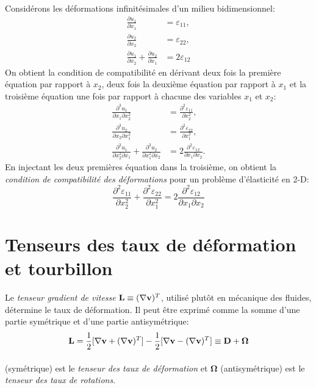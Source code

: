 \paragraph{}
Considérons les déformations infinitésimales d'un milieu bidimensionnel:
$$\begin{aligned}
\frac{\partial u_1}{\partial x_1}&=\varepsilon_{11},\\
\frac{\partial u_2}{\partial x_2}&=\varepsilon_{22},\\
\frac{\partial u_1}{\partial x_2}+\frac{\partial u_2}{\partial x_1}&=2\varepsilon_{12}
\end{aligned}$$
On obtient  la condition de compatibilité en dérivant deux fois la première équation par rapport à $x_2$, deux fois la deuxième équation par rapport à $x_1$ et la troisième équation une fois par rapport à chacune des variables $x_1$ et $x_2$:
$$\begin{aligned}
\frac{\partial^3 u_1}{\partial x_1\partial x_2^2}&=\frac{\partial^2\varepsilon_{11}}{\partial x_2^2},\\
\frac{\partial^3 u_2}{\partial x_2\partial x_1^2}&=\frac{\partial^2\varepsilon_{22}}{\partial x_1^2},\\
\frac{\partial^3 u_1}{\partial x_2^2\partial x_1}+\frac{\partial^3 u_2}{\partial x_1^2\partial x_2}&=2\frac{\partial^2\varepsilon_{12}}{\partial x_1\partial x_2}.
\end{aligned}$$
En injectant les deux premières équation dans la troisième, on obtient la \emph{condition de compatibilité des déformations} pour un problème d'élasticité en 2-D:
$$\frac{\partial^2\varepsilon_{11}}{\partial x_2^2}+\frac{\partial^2\varepsilon_{22}}{\partial x_1^2}=2\frac{\partial^2\varepsilon_{12}}{\partial x_1 \partial x_2}$$
\section{Tenseurs des taux de déformation et tourbillon}
\label{taux_defo_troub}
Le \emph{tenseur gradient de vitesse} $\textbf{L}\equiv (\nabla \textbf{v})^T$, utilisé plutôt en mécanique des fluides, détermine le taux de déformation. Il peut être exprimé comme la somme d'une partie symétrique et d'une partie antisymétrique:
$$\textbf{L}=\frac{1}{2}[\nabla\textbf{v}+(\nabla\textbf{v})^T]-\frac{1}{2}[\nabla\textbf{v}-(\nabla\textbf{v})^T]\equiv \textbf{D}+\mathbf{\Omega}$$
\paragraph{}
 (symétrique) est le \emph{tenseur des taux de déformation} et $\mathbf{\Omega}$ (antisymétrique) est le \emph{tenseur des taux de rotations}.
